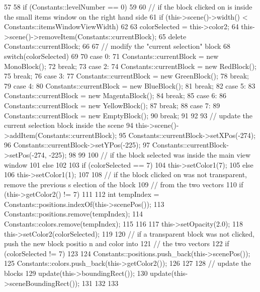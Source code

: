 \begin{DoxyCode}
57 {
58     if (Constants::levelNumber == 0)
59     {
60         // if the block clicked on is inside the small items window on the right 
      hand side
61         if (this->scene()->width() < Constants::itemsWindowViewWidth)
62         {
63             colorSelected = this->color2;
64             this->scene()->removeItem(Constants::currentBlock);
65             delete Constants::currentBlock;
66 
67             // modify the "current selection" block
68             switch(colorSelected)
69             {
70                 case 0:
71                     Constants::currentBlock = new MonoBlock();
72                     break;
73                 case 2:
74                     Constants::currentBlock = new RedBlock();
75                     break;
76                 case 3:
77                     Constants::currentBlock = new GreenBlock();
78                     break;
79                 case 4:
80                     Constants::currentBlock = new BlueBlock();
81                     break;
82                 case 5:
83                     Constants::currentBlock = new MagentaBlock();
84                     break;
85                 case 6:
86                     Constants::currentBlock = new YellowBlock();
87                     break;
88                 case 7:
89                     Constants::currentBlock = new EmptyBlock();
90                     break;
91             }
92 
93             // update the current selection block inside the scene
94             this->scene()->addItem(Constants::currentBlock);
95             Constants::currentBlock->setXPos(-274);
96             Constants::currentBlock->setYPos(-225);
97             Constants::currentBlock->setPos(-274, -225);
98         }
99 
100         // if the block selected was inside the main view window
101         else
102         {
103             if (colorSelected == 7)
104                 this->setColor1(7);
105             else
106                 this->setColor1(1);
107 
108             // if the block clicked on was not transparent, remove the previous s
      election of the block
109             // from the two vectors
110             if (this->getColor2() != 7)
111             {
112                 int tempIndex = Constants::positions.indexOf(this->scenePos());
113                 Constants::positions.remove(tempIndex);
114                 Constants::colors.remove(tempIndex);
115             }
116 
117             this->setOpacity(2.0);
118             this->setColor2(colorSelected);
119 
120             // if a transparent block was not clicked, push the new block positio
      n and color into 
121             // the two vectors
122             if (colorSelected != 7)
123             {
124                 Constants::positions.push_back(this->scenePos());
125                 Constants::colors.push_back(this->getColor2());
126             }
127 
128             // update the blocks
129             update(this->boundingRect());
130             update(this->sceneBoundingRect());
131         }
132     }
133 }
\end{DoxyCode}
